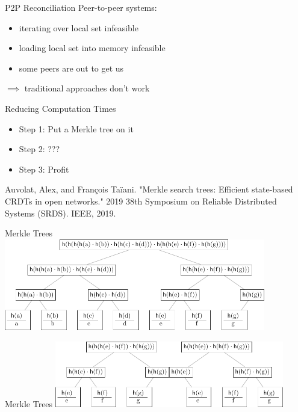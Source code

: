 \documentclass{beamer}
\begin{document}
\begin{frame}{P2P Reconciliation}
    Peer-to-peer systems:
    \begin{itemize}
        \item iterating over local set infeasible
        \item loading local set into memory infeasible
        \item some peers are out to get us
    \end{itemize}

    \pause

    $\implies$ traditional approaches don't work
\end{frame}

\begin{frame}{Reducing Computation Times}
    \begin{itemize}
        \item Step 1: Put a Merkle tree on it
        \item Step 2: ???
        \item Step 3: Profit
    \end{itemize}

    \vfill

    Auvolat, Alex, and François Taïani. "Merkle search trees: Efficient state-based CRDTs in open networks." 2019 38th Symposium on Reliable Distributed Systems (SRDS). IEEE, 2019.
\end{frame}

\begin{frame}{Merkle Trees}
    \includegraphics[keepaspectratio=true,width=11.4cm]{merkle1.pdf}
\end{frame}

\begin{frame}{Merkle Trees}
    \includegraphics[keepaspectratio=true,width=5cm]{merkle2.pdf}\hfill\includegraphics[keepaspectratio=true,width=5cm]{merkle3.pdf}
\end{frame}
\end{document}
